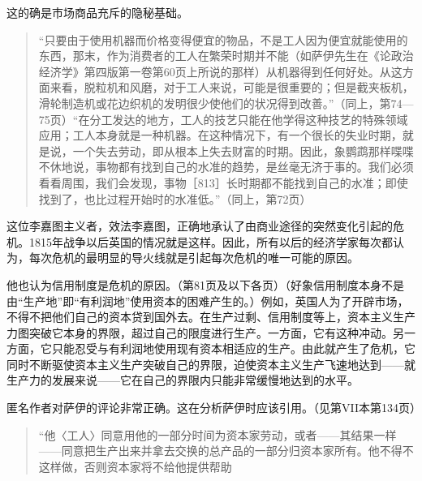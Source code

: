 这的确是市场商品充斥的隐秘基础。

\begin{quote}{“只要由于使用机器而价格变得便宜的物品，不是工人因为便宜就能使用的东西，那末，作为消费者的工人在繁荣时期并不能（如萨伊先生在《论政治经济学》第四版第一卷第60页上所说的那样）从机器得到任何好处。从这方面来看，脱粒机和风磨，对于工人来说，可能是很重要的；但是截夹板机，滑轮制造机或花边织机的发明很少使他们的状况得到改善。”（同上，第74—75页）“在分工发达的地方，工人的技艺只能在他学得这种技艺的特殊领域应用；工人本身就是一种机器。在这种情况下，有一个很长的失业时期，就是说，一个失去劳动，即从根本上失去财富的时期。因此，象鹦鹉那样喋喋不休地说，事物都有找到自己的水准的趋势，是丝毫无济于事的。我们必须看看周围，我们会发现，事物［813］长时期都不能找到自己的水准；即使找到了，也比过程开始时的水准低。”（同上，第72页）}\end{quote}

这位李嘉图主义者，效法李嘉图，正确地承认了由商业途径的突然变化引起的危机。1815年战争以后英国的情况就是这样。因此，所有以后的经济学家每次都认为，每次危机的最明显的导火线就是引起每次危机的唯一可能的原因。

他也认为信用制度是危机的原因。（第81页及以下各页）（好象信用制度本身不是由“生产地”即“有利润地”使用资本的困难产生的。）例如，英国人为了开辟市场，不得不把他们自己的资本贷到国外去。在生产过剩、信用制度等上，资本主义生产力图突破它本身的界限，超过自己的限度进行生产。一方面，它有这种冲动。另一方面，它只能忍受与有利润地使用现有资本相适应的生产。由此就产生了危机，它同时不断驱使资本主义生产突破自己的界限，迫使资本主义生产飞速地达到——就生产力的发展来说——它在自己的界限内只能非常缓慢地达到的水平。

匿名作者对萨伊的评论非常正确。这在分析萨伊时应该引用。（见第VII本第134页）

\begin{quote}{“他〈工人〉同意用他的一部分时间为资本家劳动，或者——其结果一样——同意把生产出来并拿去交换的总产品的一部分归资本家所有。他不得不这样做，否则资本家将不给他提供帮助}\end{quote}

